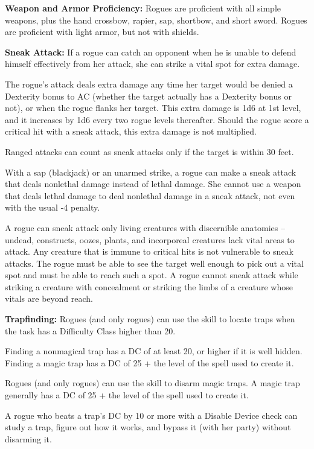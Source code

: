 \textbf{Weapon and Armor Proficiency:} Rogues are proficient with all simple weapons, plus the hand crossbow, rapier, sap, shortbow, and short sword. Rogues are proficient with light armor, but not with shields.

\textbf{Sneak Attack:} If a rogue can catch an opponent when he is unable to defend himself effectively from her attack, she can strike a vital spot for extra damage.

The rogue's attack deals extra damage any time her target would be denied a Dexterity bonus to AC (whether the target actually has a Dexterity bonus or not), or when the rogue flanks her target. This extra damage is 1d6 at 1st level, and it increases by 1d6 every two rogue levels thereafter. Should the rogue score a critical hit with a sneak attack, this extra damage is not multiplied.

Ranged attacks can count as sneak attacks only if the target is within 30 feet.

With a sap (blackjack) or an unarmed strike, a rogue can make a sneak attack that deals nonlethal damage instead of lethal damage. She cannot use a weapon that deals lethal damage to deal nonlethal damage in a sneak attack, not even with the usual -4 penalty.

A rogue can sneak attack only living creatures with discernible anatomies -- undead, constructs, oozes, plants, and incorporeal creatures lack vital areas to attack. Any creature that is immune to critical hits is not vulnerable to sneak attacks. The rogue must be able to see the target well enough to pick out a vital spot and must be able to reach such a spot. A rogue cannot sneak attack while striking a creature with concealment or striking the limbs of a creature whose vitals are beyond reach.

\textbf{Trapfinding:} Rogues (and only rogues) can use the  skill to locate traps when the task has a Difficulty Class higher than 20. 

Finding a nonmagical trap has a DC of at least 20, or higher if it is well hidden. Finding a magic trap has a DC of 25 + the level of the spell used to create it.

Rogues (and only rogues) can use the  skill to disarm magic traps. A magic trap generally has a DC of 25 + the level of the spell used to create it.

A rogue who beats a trap's DC by 10 or more with a Disable Device check can study a trap, figure out how it works, and bypass it (with her party) without disarming it.

